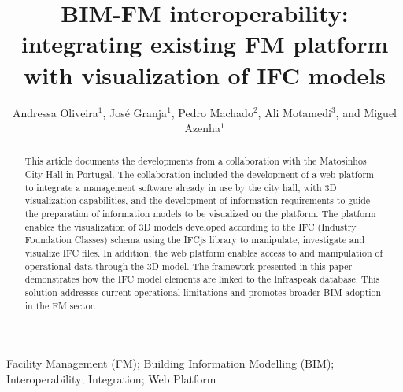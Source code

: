 \documentclass[a4paper, 10pt, twocolumn, twoside]{article}
\begin{document}
\linespread{0.5}

\title{BIM-FM interoperability: integrating existing FM platform with visualization of IFC models}

\author{Andressa Oliveira$^{1}$, José Granja$^1$, Pedro Machado$^2$, Ali Motamedi$^3$, and Miguel Azenha$^1$}




\maketitle 
\thispagestyle{fancy} 
\pagestyle{fancy}

\begin{abstract}
This article documents the developments from a collaboration with the Matosinhos City Hall in Portugal. The collaboration included the development of a web platform to integrate a management software already in use by the city hall, with 3D visualization capabilities, and the development of information requirements to guide the preparation of information models to be visualized on the platform. The platform enables the visualization of 3D models developed according to the IFC (Industry Foundation Classes) schema using the IFCjs library to manipulate, investigate and visualize IFC files. In addition, the web platform enables access to and manipulation of operational data through the 3D model. The framework presented in this paper demonstrates how the IFC model elements are linked to the Infraspeak database. This solution addresses current operational limitations and promotes broader BIM adoption in the FM sector.
\end{abstract}

\begin{keywords}
Facility Management (FM); Building Information Modelling (BIM); Interoperability; Integration; Web Platform
\end{keywords}
\end{document}
